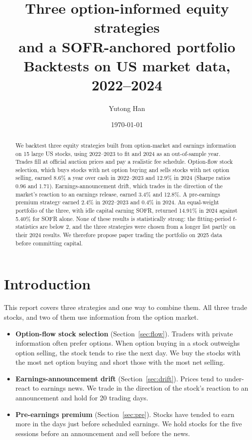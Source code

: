 \documentclass[11pt]{article}
\title{Three option-informed equity strategies\\and a SOFR-anchored portfolio\\[6pt]\large Backtests on US market data, 2022--2024}
\author{Yutong Han}
\date{\today}
\begin{document}
\maketitle

\begin{abstract}
\noindent We backtest three equity strategies built from option-market and earnings information on 15 large US stocks, using 2022--2023 to fit and 2024 as an out-of-sample year. Trades fill at official auction prices and pay a realistic fee schedule. Option-flow stock selection, which buys stocks with net option buying and sells stocks with net option selling, earned 8.6\% a year over cash in 2022--2023 and 12.9\% in 2024 (Sharpe ratios 0.96 and 1.71). Earnings-announcement drift, which trades in the direction of the market's reaction to an earnings release, earned 3.4\% and 12.8\%. A pre-earnings premium strategy earned 2.4\% in 2022--2023 and 0.4\% in 2024. An equal-weight portfolio of the three, with idle capital earning SOFR, returned 14.91\% in 2024 against 5.40\% for SOFR alone. None of these results is statistically strong: the fitting-period $t$-statistics are below 2, and the three strategies were chosen from a longer list partly on their 2024 results. We therefore propose paper trading the portfolio on 2025 data before committing capital.
\end{abstract}

\section{Introduction}\label{sec:intro}

This report covers three strategies and one way to combine them. All three trade stocks, and two of them use information from the option market.
\begin{itemize}
  \item \textbf{Option-flow stock selection} (Section~\ref{sec:flow}). Traders with private information often prefer options. When option buying in a stock outweighs option selling, the stock tends to rise the next day. We buy the stocks with the most net option buying and short those with the most net selling.
  \item \textbf{Earnings-announcement drift} (Section~\ref{sec:drift}). Prices tend to under-react to earnings news. We trade in the direction of the stock's reaction to an announcement and hold for 20 trading days.
  \item \textbf{Pre-earnings premium} (Section~\ref{sec:pre}). Stocks have tended to earn more in the days just before scheduled earnings. We hold stocks for the five sessions before an announcement and sell before the news.
\end{itemize}
\end{document}
